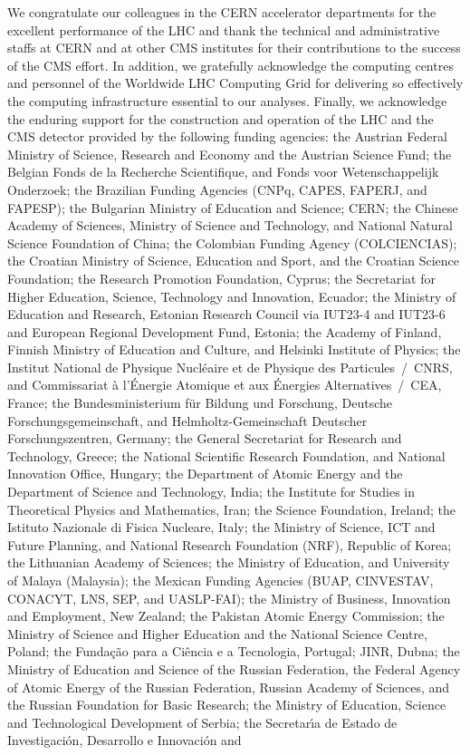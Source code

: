 \clearpage
\begin{acknowledgments}
 We congratulate our colleagues in the CERN accelerator departments for the excellent performance of the LHC and thank the technical and administrative staffs at CERN and at other CMS institutes for their contributions to the success of the CMS effort. In addition, we gratefully acknowledge the computing centres and personnel of the Worldwide LHC Computing Grid for delivering so effectively the computing infrastructure essential to our analyses. Finally, we acknowledge the enduring support for the construction and operation of the LHC and the CMS detector provided by the following funding agencies: the Austrian Federal Ministry of Science, Research and Economy and the Austrian Science Fund; the Belgian Fonds de la Recherche Scientifique, and Fonds voor Wetenschappelijk Onderzoek; the Brazilian Funding Agencies (CNPq, CAPES, FAPERJ, and FAPESP); the Bulgarian Ministry of Education and Science; CERN; the Chinese Academy of Sciences, Ministry of Science and Technology, and National Natural Science Foundation of China; the Colombian Funding Agency (COLCIENCIAS); the Croatian Ministry of Science, Education and Sport, and the Croatian Science Foundation; the Research Promotion Foundation, Cyprus; the Secretariat for Higher Education, Science, Technology and Innovation, Ecuador; the Ministry of Education and Research, Estonian Research Council via IUT23-4 and IUT23-6 and European Regional Development Fund, Estonia; the Academy of Finland, Finnish Ministry of Education and Culture, and Helsinki Institute of Physics; the Institut National de Physique Nucl\'eaire et de Physique des Particules~/~CNRS, and Commissariat \`a l'\'Energie Atomique et aux \'Energies Alternatives~/~CEA, France; the Bundesministerium f\"ur Bildung und Forschung, Deutsche Forschungsgemeinschaft, and Helmholtz-Gemeinschaft Deutscher Forschungszentren, Germany; the General Secretariat for Research and Technology, Greece; the National Scientific Research Foundation, and National Innovation Office, Hungary; the Department of Atomic Energy and the Department of Science and Technology, India; the Institute for Studies in Theoretical Physics and Mathematics, Iran; the Science Foundation, Ireland; the Istituto Nazionale di Fisica Nucleare, Italy; the Ministry of Science, ICT and Future Planning, and National Research Foundation (NRF), Republic of Korea; the Lithuanian Academy of Sciences; the Ministry of Education, and University of Malaya (Malaysia); the Mexican Funding Agencies (BUAP, CINVESTAV, CONACYT, LNS, SEP, and UASLP-FAI); the Ministry of Business, Innovation and Employment, New Zealand; the Pakistan Atomic Energy Commission; the Ministry of Science and Higher Education and the National Science Centre, Poland; the Funda\c{c}\~ao para a Ci\^encia e a Tecnologia, Portugal; JINR, Dubna; the Ministry of Education and Science of the Russian Federation, the Federal Agency of Atomic Energy of the Russian Federation, Russian Academy of Sciences, and the Russian Foundation for Basic Research; the Ministry of Education, Science and Technological Development of Serbia; the Secretar\'{\i}a de Estado de Investigaci\'on, Desarrollo e Innovaci\'on and 
\end{acknowledgments}
